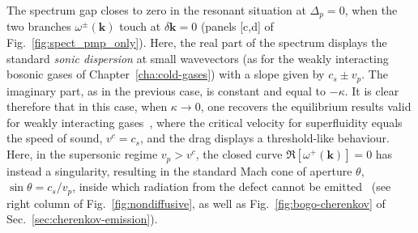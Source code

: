The spectrum gap closes to zero in the resonant situation at
$\Delta_p=0$, when the two branches $\omega^{\pm} (\bm{k})$ touch at
$\delta \bm{k}=0$ (panels [c,d] of Fig.~\ref{fig:spect_pmp_only}).
%
Here, the real part of the spectrum displays the standard \emph{sonic
  dispersion} at small wavevectors (as for the weakly interacting
bosonic gases of Chapter~\ref{cha:cold-gases}) with a slope given by
$c_s \pm v_p$. The imaginary part, as in the previous case, is
constant and equal to $-\kappa$. It is clear therefore that in this
case, when $\kappa \to 0$, one recovers the equilibrium results valid
for weakly interacting gases~\cite{Astrakharchik_2004,Carusotto_2006},
where the critical velocity for superfluidity equals the speed of
sound, $v^c=c_s$, and the drag displays a threshold-like
behaviour. Here, in the supersonic regime $v_p > v^c$, the closed
curve $\Re[ \omega^{+} (\bm{k})] = 0$ has instead a singularity,
resulting in the standard Mach cone of aperture $\theta$, $\sin \theta
= c_s/v_p$, inside which radiation from the defect cannot be
emitted~\cite{Carusotto_2006} (see right column of
Fig.~\ref{fig:nondiffusive}, as well as Fig.~\ref{fig:bogo-cherenkov}
of Sec.~\ref{sec:cherenkov-emission}).


